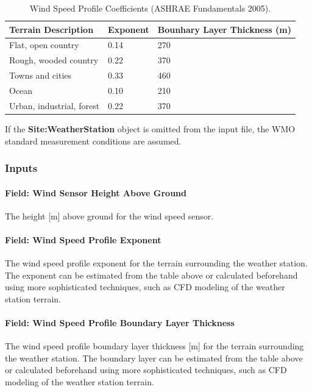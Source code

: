 \begin{longtable}[c]{@{}lll@{}}
\caption{Wind Speed Profile Coefficients (ASHRAE Fundamentals 2005). \protect \label{table:wind-speed-profile-coefficients-ashrae}}\\
\toprule 
Terrain Description & Exponent & Bounhary Layer Thickness (m) \tabularnewline \midrule
\endhead
Flat, open country & 0.14 & 270 \tabularnewline
Rough, wooded country & 0.22 & 370 \tabularnewline
Towns and cities & 0.33 & 460 \tabularnewline
Ocean & 0.10 & 210 \tabularnewline
Urban, industrial, forest & 0.22 & 370 \tabularnewline
\bottomrule
\end{longtable}

If the \textbf{Site:WeatherStation} object is omitted from the input file, the WMO standard measurement conditions are assumed.

\subsubsection{Inputs}\label{inputs-9-010}

\paragraph{Field: Wind Sensor Height Above Ground}\label{field-wind-sensor-height-above-ground}

The height {[}m{]} above ground for the wind speed sensor.

\paragraph{Field: Wind Speed Profile Exponent}\label{field-wind-speed-profile-exponent}

The wind speed profile exponent for the terrain surrounding the weather station. The exponent can be estimated from the table above or calculated beforehand using more sophisticated techniques, such as CFD modeling of the weather station terrain.

\paragraph{Field: Wind Speed Profile Boundary Layer Thickness}\label{field-wind-speed-profile-boundary-layer-thickness}

The wind speed profile boundary layer thickness {[}m{]} for the terrain surrounding the weather station. The boundary layer can be estimated from the table above or calculated beforehand using more sophisticated techniques, such as CFD modeling of the weather station terrain.


